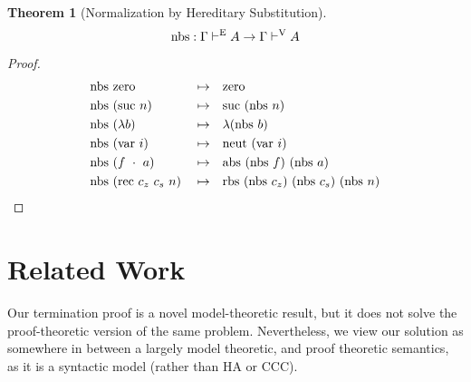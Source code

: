 \documentclass[preprint,nonatbib]{sigplanconf}
\numberwithin{subdefin}{defin}
\theoremstyle{definition}
\newtheorem{theorem}{Theorem}
\numberwithin{subtheorem}{theorem}
\numberwithin{sublemma}{theorem}
\numberwithin{corollary}{theorem}
\numberwithin{case}{theorem}
\numberwithin{slcase}{sublemma}
\numberwithin{scase}{subtheorem}
\numberwithin{lcase}{lemma}
\def\dfn{\mapsto}
\def\arr{\supset}
\def\marr{\rightarrow}
\def\app{\cdot}
\def\lam{\lambda}
\def\var{\con{var}}
\def\zero{\con{zero}}
\def\suc{\con{suc}}
\def\neut{\con{neut}}
\def\rec{\fun{rec}}
\def\rbs{\fun{rbs}}
\def\abs{\fun{abs}}
\def\nbs{\fun{nbs}}
\newcommand{\turn}[1]{\vdash^\con{#1}}
\newcommand{\el}[1]{\llbracket ~ #1 ~ \rrbracket}
\newcommand{\con}[1]{\textmd{#1}}
\newcommand{\fun}[1]{\textmd{#1}}
\newcommand{\typm}[1]{\el{\Gamma \vdash #1}}
\newcommand{\dtypm}[1]{\el{\Delta \vdash #1}}
\newcommand{\type}[1]{\Gamma \turn{E} #1}
\newcommand{\typv}[1]{\Gamma \turn{V} #1}
\newcommand{\dtypv}[1]{\Delta \turn{V} #1}
\newcommand{\denv}[1]{\fun{Env}~#1~\Delta}
\begin{document}
\begin{theorem}[Normalization by Hereditary Substitution]
\label{thm:mod:nbs}
$$
\nbs : \type{A} \marr \typv{A}
$$

\begin{proof}
\begin{align*}
&\nbs ~ \zero &&\dfn&& \zero\\
&\nbs ~ (\suc~n) &&\dfn&& \suc ~ (\nbs~n)\\
&\nbs ~ (\lam b) &&\dfn&& \lam (\nbs~b)\\
&\nbs ~ (\var~i) &&\dfn&& \neut ~ (\var~i)\\
&\nbs ~ (f~\app~a) &&\dfn&& \abs ~ (\nbs~f) ~ (\nbs~a)\\
&\nbs ~ (\rec~c_z~c_s~n) &&\dfn&& \rbs~(\nbs~c_z)~(\nbs~c_s)~(\nbs~n)
\end{align*}
\end{proof}



\end{theorem}






\section{Related Work}

Our termination proof is a novel model-theoretic result, but it
does not solve the proof-theoretic version of the same problem.
Nevertheless, we view our solution as somewhere in between a largely
model theoretic, and proof theoretic semantics, as it is a syntactic
model (rather than HA or CCC).

\end{document}
